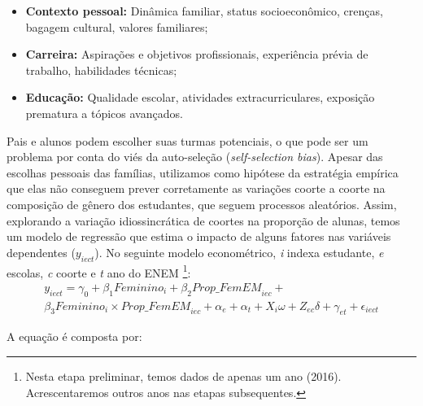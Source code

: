 \begin{itemize}
  \item \textbf{Contexto pessoal:} Dinâmica familiar, status socioeconômico, crenças, bagagem cultural, valores familiares;
  \item \textbf{Carreira:} Aspirações e objetivos profissionais, experiência prévia de trabalho, habilidades técnicas; 
  \item \textbf{Educação:} Qualidade escolar, atividades extracurriculares, exposição prematura a tópicos avançados. 
\end{itemize}

Pais e alunos podem escolher suas turmas potenciais, o que pode ser um problema por conta do viés da auto-seleção (\textit{self-selection bias}). Apesar das escolhas pessoais das famílias, utilizamos como hipótese da estratégia empírica que elas não conseguem prever corretamente as variações coorte a coorte na composição de gênero dos estudantes, que seguem processos aleatórios. Assim, explorando a variação idiossincrática de coortes na proporção de alunas, temos um modelo de regressão que estima o impacto de alguns fatores nas variáveis dependentes ($y_{iect}$). No seguinte modelo econométrico, \textit{i} indexa estudante, \textit{e} escolas, \textit{c} coorte e \textit{t} ano do ENEM \footnote{Nesta etapa preliminar, temos dados de apenas um ano (2016). Acrescentaremos outros anos nas etapas subsequentes.}:
\begin{gather*}
y_{iect} = \gamma_0 + \beta_1 \textit{Feminino}_i + \beta_2 \textit{Prop\_FemEM}_{iec} + \\ \beta_3 \textit{Feminino}_i \times \textit{Prop\_FemEM}_{iec} + \alpha_e + \alpha_t + X_i \omega + Z_{ec} \delta + \gamma_{et} + \epsilon_{iect}
\end{gather*}

A equação é composta por:

